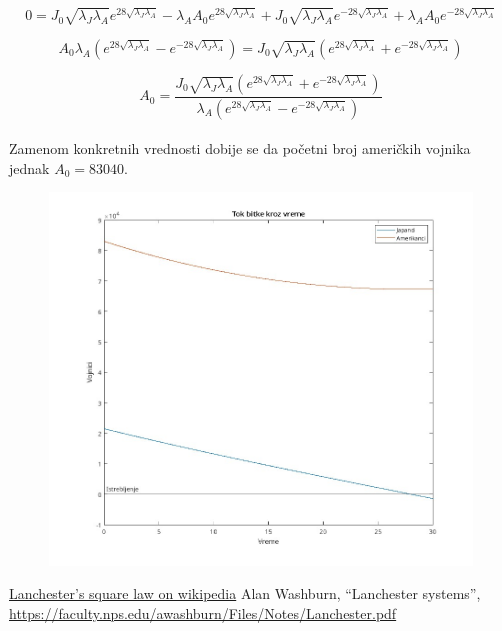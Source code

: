 \documentclass{article}
\newcommand{\laj}{\sqrt{\lambda_J\lambda_A}}
\begin{document}
\[
  0 = J_0 \laj e^{28 \laj } - \lambda_A A_0 e^{28 \laj} +
  J_0 \laj e^{-28 \laj} + \lambda_A A_0 e^{-28 \laj}
\]

\[
  A_0 \lambda_A (e^{28 \laj} - e^{-28 \laj})
=
  J_0 \laj(e^{28 \laj} + e^{-28 \laj})
\]

\[
  A_0 =
  \frac{J_0 \laj(e^{28 \laj} + e^{-28 \laj})}
  {\lambda_A (e^{28 \laj} - e^{-28 \laj})}
\]
\\
Zamenom konkretnih vrednosti dobije se da početni broj američkih vojnika
jednak \(A_0 = 83040\). \\

\begin{figure}[htbp]
    \center
    \includegraphics[scale=0.35]{img/bitka28.jpg}
    
\end{figure}



\begin{thebibliography}{1}
    \href{https://en.wikipedia.org/wiki/Lanchester's_laws}
         {Lanchester's square law on wikipedia}
    Alan Washburn,
    ``Lanchester systems'',
    \url{https://faculty.nps.edu/awashburn/Files/Notes/Lanchester.pdf}
\end{thebibliography}

\end{document}
